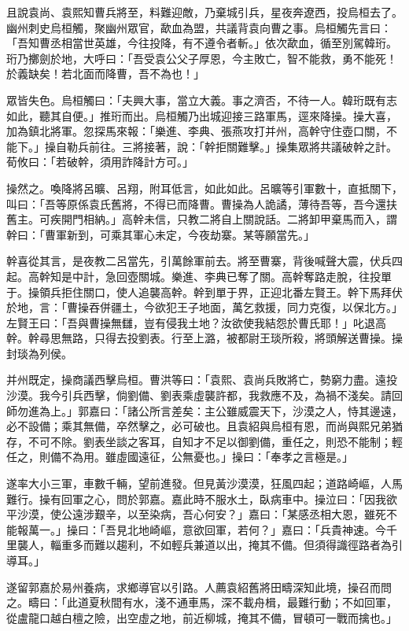 且說袁尚、袁熙知曹兵將至，料難迎敵，乃棄城引兵，星夜奔遼西，投烏桓去了。幽州刺史烏桓觸，聚幽州眾官，歃血為盟，共議背袁向曹之事。烏桓觸先言曰：「吾知曹丞相當世英雄，今往投降，有不遵令者斬。」依次歃血，循至別駕韓珩。珩乃擲劍於地，大呼曰：「吾受袁公父子厚恩，今主敗亡，智不能救，勇不能死！於義缺矣！若北面而降曹，吾不為也！」

眾皆失色。烏桓觸曰：「夫興大事，當立大義。事之濟否，不待一人。韓珩既有志如此，聽其自便。」推珩而出。烏桓觸乃出城迎接三路軍馬，逕來降操。操大喜，加為鎮北將軍。忽探馬來報：「樂進、李典、張燕攻打并州，高幹守住壺口關，不能下。」操自勒兵前往。三將接著，說：「幹拒關難擊。」操集眾將共議破幹之計。荀攸曰：「若破幹，須用詐降計方可。」

操然之。喚降將呂曠、呂翔，附耳低言，如此如此。呂曠等引軍數十，直抵關下，叫曰：「吾等原係袁氏舊將，不得已而降曹。曹操為人詭譎，薄待吾等，吾今還扶舊主。可疾開門相納。」高幹未信，只教二將自上關說話。二將卸甲棄馬而入，謂幹曰：「曹軍新到，可乘其軍心未定，今夜劫寨。某等願當先。」

幹喜從其言，是夜教二呂當先，引萬餘軍前去。將至曹寨，背後喊聲大震，伏兵四起。高幹知是中計，急回壺關城。樂進、李典已奪了關。高幹奪路走脫，往投單于。操領兵拒住關口，使人追襲高幹。幹到單于界，正迎北番左賢王。幹下馬拜伏於地，言：「曹操吞併疆土，今欲犯王子地面，萬乞救援，同力克復，以保北方。」左賢王曰：「吾與曹操無讎，豈有侵我土地？汝欲使我結怨於曹氏耶！」叱退高幹。幹尋思無路，只得去投劉表。行至上潞，被都尉王琰所殺，將頭解送曹操。操封琰為列侯。

并州既定，操商議西擊烏桓。曹洪等曰：「袁熙、袁尚兵敗將亡，勢窮力盡。遠投沙漠。我今引兵西擊，倘劉備、劉表乘虛襲許都，我救應不及，為禍不淺矣。請回師勿進為上。」郭嘉曰：「諸公所言差矣：主公雖威震天下，沙漠之人，恃其邊遠，必不設備；乘其無備，卒然擊之，必可破也。且袁紹與烏桓有恩，而尚與熙兄弟猶存，不可不除。劉表坐談之客耳，自知才不足以御劉備，重任之，則恐不能制；輕任之，則備不為用。雖虛國遠征，公無憂也。」操曰：「奉孝之言極是。」

遂率大小三軍，車數千輛，望前進發。但見黃沙漠漠，狂風四起；道路崎嶇，人馬難行。操有回軍之心，問於郭嘉。嘉此時不服水土，臥病車中。操泣曰：「因我欲平沙漠，使公遠涉艱辛，以至染病，吾心何安？」嘉曰：「某感丞相大恩，雖死不能報萬一。」操曰：「吾見北地崎嶇，意欲回軍，若何？」嘉曰：「兵貴神速。今千里襲人，輜重多而難以趨利，不如輕兵兼道以出，掩其不備。但須得識徑路者為引導耳。」

遂留郭嘉於易州養病，求鄉導官以引路。人薦袁紹舊將田疇深知此境，操召而問之。疇曰：「此道夏秋間有水，淺不通車馬，深不載舟楫，最難行動；不如回軍，從盧龍口越白檀之險，出空虛之地，前近柳城，掩其不備，冒頓可一戰而擒也。」

